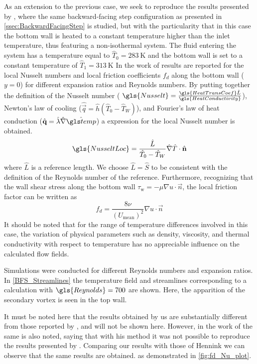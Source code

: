 As an extension to the previous case, we seek to reproduce the results presented by \cite{xieFluidFlowHeat2016}, where the same backward-facing step configuration as presented in \cref{ssec:BackwardFacingStep} is studied, but with the particularity that in this case the bottom wall is heated to a constant temperature higher than the inlet temperature, thus featuring a non-isothermal system. The fluid entering the system has a temperature equal to $\hat T_0 = \SI{283}{\kelvin}$ and the bottom wall is set to a constant temperature of $\hat T_1 =\SI{313}{\kelvin}$
In the work of \cite{xieFluidFlowHeat2016} results are reported for the local Nusselt numbers and local friction coefficients $f_d$  along the bottom wall ($y = 0$) for different expansion ratios and Reynolds numbers. By putting together the definition of the Nusselt number ( $\gls{Nusselt} = \frac{\gls{HeatTransCoef}\hat{L}}{\gls{HeatConductivity}}$), Newton's law of cooling ($\hat{\vec{q}} = \hat{h} (\hat{T}_0 - \hat{T}_W )$), and Fourier's law of heat conduction ($\hat{\vec{q}} = \hat \lambda \hat{\nabla} \glsHat{temp}$) a expression for the local Nusselt number is obtained.
\begin{equation}
	\gls{NusseltLoc} = \frac{\hat L}{\hat T_0-\hat T_W}\hat \nabla \hat T \cdot \hat {\vec{n}}
\end{equation}
where $\hat L$ is a reference length. We choose $ \hat L = \hat S$ to be consistent with the definition of the Reynolds number of the reference. Furthermore, recognizing that the wall shear stress along the bottom wall $\tau_{\text{w}} = -\mu \nabla u \cdot \vec{n}$, the local friction factor can be written as
\begin{equation}
	f_d = \frac{8\nu} { (U_{\text{mean}})^2}  \nabla u \cdot \vec{n}
\end{equation}
It should be noted that for the range of temperature differences involved in this case, the variation of physical parameters such as density, viscosity, and thermal conductivity with respect to temperature has no appreciable influence on the calculated flow fields.

Simulations were conducted for different Reynolds numbers and expansion ratios. In \cref{BFS_Streamlines} the temperature field and streamlines corresponding to a calculation with $\gls{Reynolds} = 700$ are shown. Here, the apparition of the secondary vortex is seen in the top wall.

It must be noted here that the results obtained by us are substantially different from those reported by \cite{xieFluidFlowHeat2016}, and will not be shown here. However, in the work of \cite{henninkLowMachNumberFlow2022} the same is also noted, saying that with his method it was not possible to reproduce the results presented by \cite{xieFluidFlowHeat2016}. Comparing our results with those of Hennink we can observe that the same results are obtained. as demonstrated in \cref{fig:fd_Nu_plot}.%

